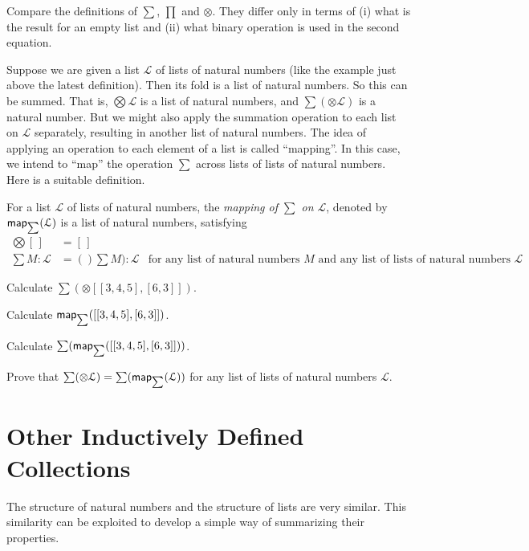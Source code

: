 Compare the definitions of $\sum$, $\prod$ and $\otimes$. They differ only in terms of (i) what is the result for an empty list
and (ii) what binary operation is used in the second equation.

Suppose we are given a list $\mathcal L$ of lists of natural numbers (like the example just above the latest definition). Then its fold is a list of natural numbers. So this can be summed. That is, $\bigotimes \mathcal L$ is a list of natural numbers, and $\sum(\otimes \mathcal L)$ is a natural number. But we might also apply the summation operation to each list on $\mathcal L$ separately, resulting in another list of natural numbers.
The idea of applying an operation to each element of a list is called ``mapping''. In this case, we intend to ``map'' the operation $\sum$
across lists of lists of natural numbers. Here is a suitable definition.

\begin{defn}
	For a list $\mathcal L$ of lists of natural numbers, the \emph{mapping of $\sum$
		 on $\mathcal L$}, denoted by $\mathord{\textsf{map}}_{\sum}(\mathcal L)$
	is a list of natural numbers, satisfying
	\begin{align*}
	\bigotimes[\,] &= [\,]\\
	\sum M:\mathcal L &= ()\sum M): \mathcal L &\text{for any list of natural numbers $M$ and any list of lists of natural numbers $\mathcal L$}
	\end{align*}
\end{defn}

\begin{exercises}
	\item Calculate $\sum(\otimes[[3,4,5],[6,3]])$.
	\item Calculate $\mathord{\textsf{map}}_{\sum}([[3,4,5],[6,3]])$.
	\item Calculate $\sum(\mathord{\textsf{map}}_{\sum}([[3,4,5],[6,3]]))$.
	\item Prove that $\sum(\otimes\mathcal L) = \sum(\mathord{\textsf{map}}_{\sum}(\mathcal L))$ for any list of lists of natural numbers $\mathcal L$.
\end{exercises}


\section{Other Inductively Defined Collections}

The structure of natural numbers and the structure of lists are very similar. This similarity can be exploited to 
develop a simple way of summarizing their properties.

